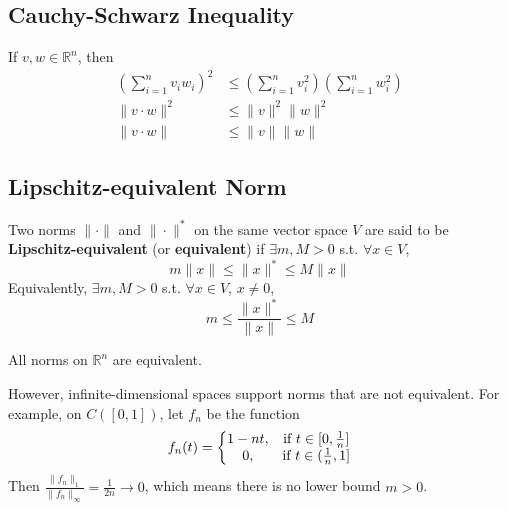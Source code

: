 \documentclass[11pt]{elegantbook}
\begin{document}
\subsection{Cauchy-Schwarz Inequality}
\begin{theorem}
    If $v, w \in \mathbb{R}^n$, then
    $$
    \begin{aligned}
    \left(\sum_{i=1}^n v_i w_i\right)^2 & \leq\left(\sum_{i=1}^n v_i^2\right)\left(\sum_{i=1}^n w_i^2\right) \\
    \|v \cdot w\|^2 & \leq\|v\|^2\|w\|^2 \\
    \|v \cdot w\| & \leq\|v\|\|w\|
    \end{aligned}
    $$
\end{theorem}

\subsection{Lipschitz-equivalent Norm}
\begin{definition}
\normalfont
Two norms $\|\cdot\|$ and $\|\cdot\|^*$ on the same vector space $V$ are said to be \textbf{Lipschitz-equivalent} (or \textbf{equivalent}) if $\exists m,M>0$ s.t. $\forall x\in V$, $$m\|x\|\leq\|x\|^*\leq M\|x\|$$
Equivalently, $\exists m,M>0$ s.t. $\forall x\in V$, $x\neq 0$, $$m\leq\frac{\|x\|^*}{\|x\|}\leq M$$
\end{definition}
\begin{theorem}
    All norms on $\mathbb{R}^n$ are equivalent.
\end{theorem}
However, infinite-dimensional spaces support norms that are not equivalent. For example, on $C([0, 1])$, let $f_n$ be the function $$f_n(t)=\left\{\begin{matrix}
    1-nt,&\textnormal{if }t\in[0,\frac{1}{n}]\\
    0,&\textnormal{if }t\in(\frac{1}{n},1]
\end{matrix}\right.$$ Then $\frac{\|f_n\|_1}{\|f_n\|_\infty}=\frac{1}{2n}\rightarrow 0$, which means there is no lower bound $m>0$.
\end{document}
